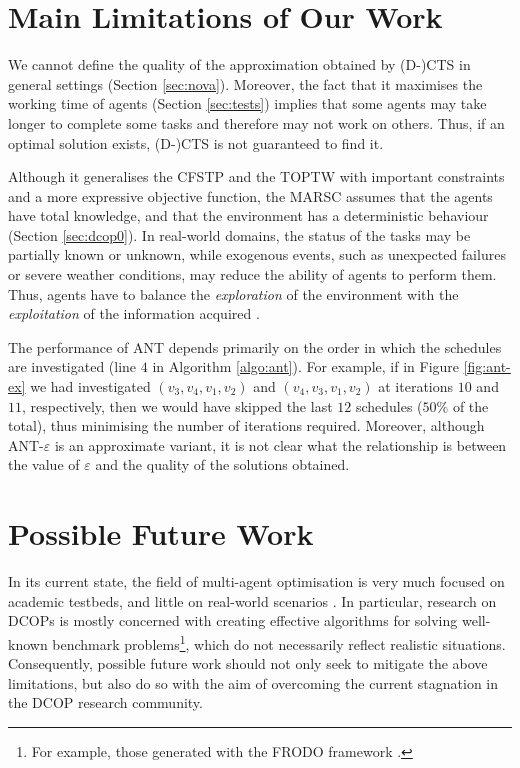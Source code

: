 \section*{Main Limitations of Our Work}

We cannot define the quality of the approximation obtained by (D-)CTS in general settings
(Section \ref{sec:nova}). Moreover, the fact that it maximises the working time of agents
(Section \ref{sec:tests}) implies that some agents may take longer to complete some tasks
and therefore may not work on others. Thus, if an optimal solution exists, (D-)CTS is not
guaranteed to find it.

Although it generalises the CFSTP and the TOPTW with important constraints and a more
expressive objective function, the MARSC assumes that the agents have total knowledge, and
that the environment has a deterministic behaviour (Section \ref{sec:dcop0}).
In real-world domains, the status of the tasks may be partially known or unknown, while
exogenous events, such as unexpected failures or severe weather conditions, may reduce the
ability of agents to perform them. Thus, agents have to balance the \emph{exploration} of
the environment with the \emph{exploitation} of the information acquired
\cite{taylor2010,taylor2011}.

The performance of ANT depends primarily on the order in which the schedules are
investigated (line $4$ in Algorithm \ref{algo:ant}). For example, if in Figure
\ref{fig:ant-ex} we had investigated $(v_3, v_4, v_1, v_2)$ and $(v_4, v_3, v_1, v_2)$ at
iterations $10$ and $11$, respectively, then we would have skipped the last $12$ schedules
($50\%$ of the total), thus minimising the number of iterations required.
Moreover, although ANT-$\varepsilon$ is an approximate variant, it is not clear what the
relationship is between the value of $\varepsilon$ and the quality of the solutions
obtained.

\section*{Possible Future Work}

In its current state, the field of multi-agent optimisation is very much focused on
academic testbeds, and little on real-world scenarios \cite{dignum2020,zivan2021opt}. In
particular, research on DCOPs is mostly concerned with creating effective algorithms for
solving well-known benchmark problems\footnote{For example, those generated with the
FRODO framework \cite[Section $9.4.2$]{fioretto2018survey}.}, which do not
necessarily reflect realistic situations. Consequently, possible future work should not
only seek to mitigate the above limitations, but also do so with the aim of overcoming the
current stagnation in the DCOP research community.


